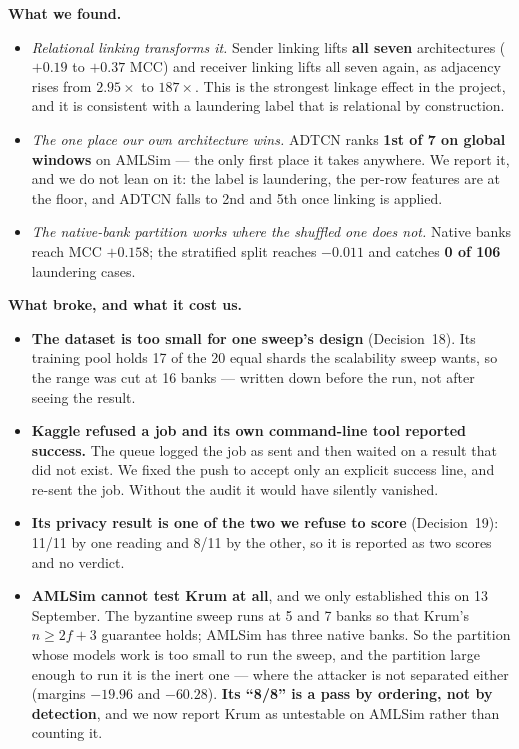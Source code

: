 \documentclass[11pt]{article}
\begin{document}
\textbf{What we found.}
\begin{itemize}\itemsep2pt
  \item \emph{Relational linking transforms it.} Sender linking lifts \textbf{all seven} architectures
        ($+0.19$ to $+0.37$ MCC) and receiver linking lifts all seven again, as adjacency rises from
        $2.95\times$ to $187\times$. This is the strongest linkage effect in the project, and it is
        consistent with a laundering label that is relational by construction.
  \item \emph{The one place our own architecture wins.} ADTCN ranks \textbf{1st of 7 on global windows} on
        AMLSim --- the only first place it takes anywhere. We report it, and we do not lean on it: the
        label is laundering, the per-row features are at the floor, and ADTCN falls to 2nd and 5th once
        linking is applied.
  \item \emph{The native-bank partition works where the shuffled one does not.} Native banks reach MCC
        $+0.158$; the stratified split reaches $-0.011$ and catches \textbf{0 of 106} laundering cases.
\end{itemize}

\textbf{What broke, and what it cost us.}
\begin{itemize}\itemsep2pt
  \item \textbf{The dataset is too small for one sweep's design} (Decision~18). Its training pool holds 17
        of the 20 equal shards the scalability sweep wants, so the range was cut at 16 banks --- written
        down before the run, not after seeing the result.
  \item \textbf{Kaggle refused a job and its own command-line tool reported success.} The queue logged the
        job as sent and then waited on a result that did not exist. We fixed the push to accept only an
        explicit success line, and re-sent the job. Without the audit it would have silently vanished.
  \item \textbf{Its privacy result is one of the two we refuse to score} (Decision~19): 11/11 by one
        reading and 8/11 by the other, so it is reported as two scores and no verdict.
  \item \textbf{AMLSim cannot test Krum at all}, and we only established this on 13 September. The
        byzantine sweep runs at 5 and 7 banks so that Krum's $n \ge 2f+3$ guarantee holds; AMLSim has three
        native banks. So the partition whose models work is too small to run the sweep, and the partition
        large enough to run it is the inert one --- where the attacker is not separated either (margins
        $-19.96$ and $-60.28$). \textbf{Its ``8/8'' is a pass by ordering, not by detection}, and we now
        report Krum as untestable on AMLSim rather than counting it.
\end{itemize}
\end{document}
